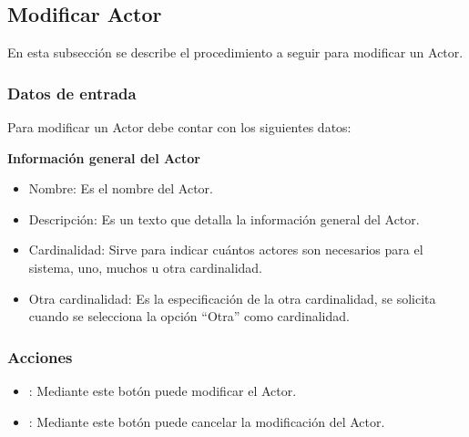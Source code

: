 \subsection{Modificar Actor}
En esta subsección se describe el procedimiento a seguir para modificar un Actor.

\subsubsection{Datos de entrada}
\begin{description}
	\item Para modificar un Actor debe contar con los siguientes datos: \hspace{10pt}
	\begin{description}
	    \item \textbf{Información general del Actor}
	    \begin{itemize}
		  \item Nombre: Es el nombre del Actor.
		  \item Descripción: Es un texto que detalla la información general del Actor.
		  \item Cardinalidad: Sirve para indicar cuántos actores son necesarios para el sistema, uno, muchos u otra cardinalidad.
		  \item Otra cardinalidad: Es la especificación de la otra cardinalidad, se solicita cuando se selecciona la opción ``Otra'' como cardinalidad.
	    \end{itemize}
	 \end{description}
\end{description}

\subsubsection{Acciones}
\begin{itemize}
 \item {}: Mediante este botón puede modificar el Actor.
 \item {}: Mediante este botón puede cancelar la modificación del Actor.
\end{itemize}
	
	
